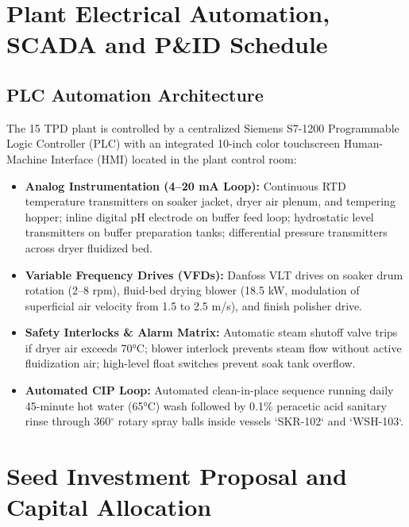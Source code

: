\documentclass[10pt,a4paper]{article}
\begin{document}
\section{Plant Electrical Automation, SCADA and P\&ID Schedule}

\subsection{PLC Automation Architecture}
The 15 TPD plant is controlled by a centralized Siemens S7-1200 Programmable Logic Controller (PLC) with an integrated 10-inch color touchscreen Human-Machine Interface (HMI) located in the plant control room:
\begin{itemize}[leftmargin=*]
    \item \textbf{Analog Instrumentation (4--20 mA Loop):} Continuous RTD temperature transmitters on soaker jacket, dryer air plenum, and tempering hopper; inline digital pH electrode on buffer feed loop; hydrostatic level transmitters on buffer preparation tanks; differential pressure transmitters across dryer fluidized bed.
    \item \textbf{Variable Frequency Drives (VFDs):} Danfoss VLT drives on soaker drum rotation (2--8 rpm), fluid-bed drying blower (18.5 kW, modulation of superficial air velocity from 1.5 to 2.5 m/s), and finish polisher drive.
    \item \textbf{Safety Interlocks \& Alarm Matrix:} Automatic steam shutoff valve trips if dryer air exceeds 70\si{\celsius}; blower interlock prevents steam flow without active fluidization air; high-level float switches prevent soak tank overflow.
    \item \textbf{Automated CIP Loop:} Automated clean-in-place sequence running daily 45-minute hot water (65\si{\celsius}) wash followed by 0.1\% peracetic acid sanitary rinse through 360$^\circ$ rotary spray balls inside vessels `SKR-102` and `WSH-103`.
\end{itemize}

\section{Seed Investment Proposal and Capital Allocation}
\end{document}

